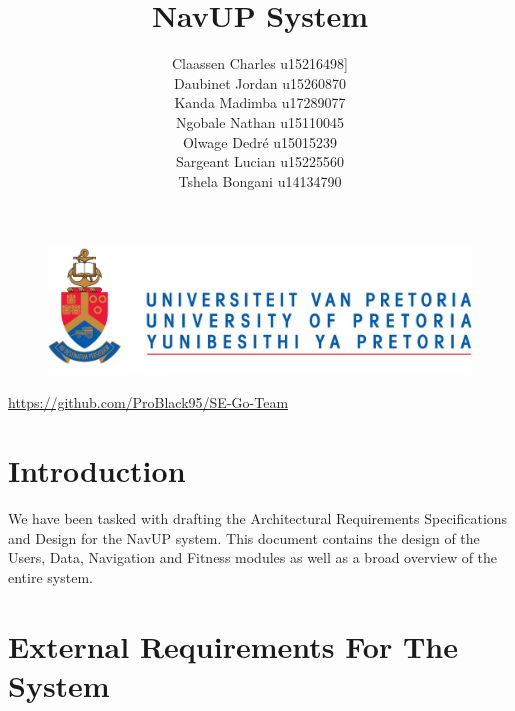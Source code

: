 \documentclass[a4paper, 12pt, one column]{article}
\begin{document}
\begin{figure}
		\includegraphics[width=\linewidth]{Images/logo.jpg}	
\end{figure}
    
\title{NavUP System}
\author{
				Claassen Charles u15216498]\\
                Daubinet Jordan u15260870\\
                Kanda Madimba u17289077\\
                Ngobale Nathan u15110045\\
                Olwage Dedré u15015239\\
                Sargeant Lucian u15225560\\
                Tshela Bongani u14134790\\
        }
        
\maketitle
	\begin{center}
			\url{https://github.com/ProBlack95/SE-Go-Team}	
	\end{center}
	\newpage
    
\tableofcontents
\newpage

\section{Introduction}
We have been tasked with drafting the Architectural Requirements Specifications and Design for the NavUP system. This document contains the design of the Users, Data, Navigation and Fitness modules as well as a broad overview of the entire system.

\section{External Requirements For The System}
\end{document}

